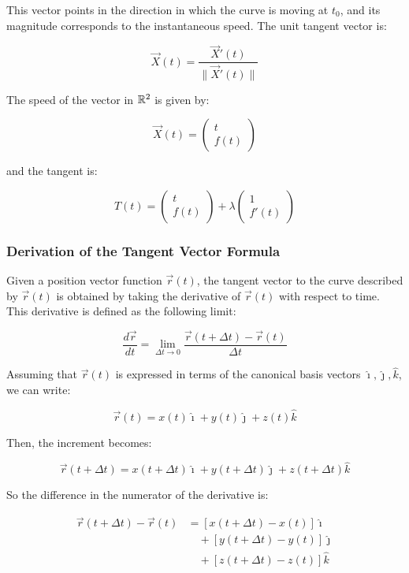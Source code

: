 This vector points in the direction in which the curve is moving at \( t_0 \), and its magnitude 
corresponds to the instantaneous speed. The unit tangent vector is:

\[
    \vec{X}(t) = \frac{\vec{X}'(t)}{\|\vec{X}'(t)\|}
\]

The speed of the vector in \(\mathbb{R}^2\) is given by:

\[
    \vec{X}(t) = \begin{pmatrix}
        t \\ f(t)
    \end{pmatrix}
\]

and the tangent is:

\[
    T(t) = \begin{pmatrix}
        t \\ f(t)
    \end{pmatrix} + \lambda \begin{pmatrix}
        1 \\ f'(t)
    \end{pmatrix}
\]

\subsubsection{Derivation of the Tangent Vector Formula}

Given a position vector function \(\vec{r}(t)\), the tangent vector to the curve described by 
\(\vec{r}(t)\) is obtained by taking the derivative of \(\vec{r}(t)\) with respect to time. This 
derivative is defined as the following limit:

\[
    \frac{d\vec{r}}{dt} = \lim_{\Delta t \to 0} \frac{\vec{r}(t + \Delta t) - \vec{r}(t)}{\Delta t}
\]

Assuming that \(\vec{r}(t)\) is expressed in terms of the canonical basis vectors \(\hat{\imath}, 
\hat{\jmath}, \hat{k}\), we can write:

\[
    \vec{r}(t) = x(t)\hat{\imath} + y(t)\hat{\jmath} + z(t)\hat{k}
\]

Then, the increment becomes:

\[
    \vec{r}(t + \Delta t) = x(t + \Delta t)\hat{\imath} + y(t + \Delta t)\hat{\jmath} + z(t + \Delta t)
    \hat{k}
\]

So the difference in the numerator of the derivative is:

\begin{align*}
    \vec{r}(t + \Delta t) - \vec{r}(t) &= \left[x(t + \Delta t) - x(t)\right]\hat{\imath} \\
    &\quad + \left[y(t + \Delta t) - y(t)\right]\hat{\jmath} \\
    &\quad + \left[z(t + \Delta t) - z(t)\right]\hat{k}
\end{align*}

